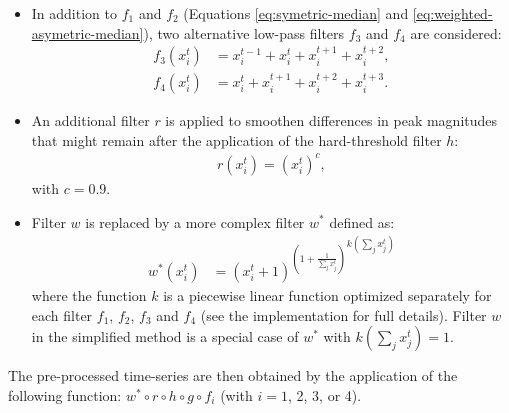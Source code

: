 \documentclass[wcp]{jmlr}
\begin{document}
\begin{itemize}
\item In addition to $f_1$ and $f_2$ (Equations \ref{eq:symetric-median} and
  \ref{eq:weighted-asymetric-median}), two alternative low-pass filters $f_3$
  and $f_4$ are considered:
\begin{align}
f_3(x^t_i) &= x^{t-1}_i + x^{t}_i + x^{t+1}_i + x^{t+2}_i, \label{eq:asymetric-median-forward} \\
f_4(x^t_i) &=  x_i^t + x^{t+1}_i  + x^{t+2}_i + x^{t+3}_i. \label{eq:asymetric-median}
\end{align}
\item An additional filter $r$ is applied to smoothen differences in peak magnitudes
  that might remain after the application of the hard-threshold filter $h$:
\begin{align}
r(x^t_i) = (x_i^t)^c,
\end{align}
with $c=0.9$.
\item Filter $w$ is replaced by a more complex filter $w^*$ defined as:
\begin{align}
 w^*(x^{t}_i) &= {(x^{t}_i + 1 )^{\left (1 + \frac{1}{\sum_{j} x^{t}_j}\right )}}^{k(\sum_{j} x^{t}_j)}
\end{align}
where the function $k$ is a piecewise linear function optimized separately for
each filter $f_1$, $f_2$, $f_3$ and $f_4$ (see the implementation for full
details). Filter $w$ in the simplified method is a special case of $w^*$ with
$k(\sum_j x_j^t)=1$.
\end{itemize}
The pre-processed time-series are then obtained by the application of the
following function: $w^*\circ r \circ h \circ g \circ f_i$ (with $i=1$, 2, 3, or 4).


\end{document}
